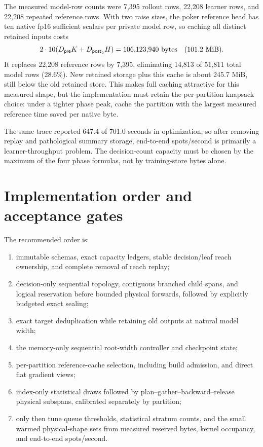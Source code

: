 \documentclass[10pt,a4paper]{article}
\begin{document}
The measured model-row counts were 7,395 rollout rows, 22,208 learner rows, and
22,208 repeated reference rows.  With two raise sizes, the poker reference head
has ten native fp16 sufficient scalars per private model row, so caching all
distinct retained inputs costs
\[
 2\cdot10(D_{\mathsf{pre}}K+D_{\mathsf{post}_2}H)
 =106{,}123{,}940\ \textnormal{bytes}\quad(101.2\ \textnormal{MiB}).
\]
It replaces 22,208 reference rows by 7,395, eliminating 14,813 of 51,811 total
model rows (28.6\%).  New retained storage plus this cache is about 245.7 MiB,
still below the old retained store.  This makes full caching attractive for
this measured shape, but the implementation must retain the per-partition
knapsack choice: under a tighter phase peak, cache the partition with the
largest measured reference time saved per native byte.

The same trace reported 647.4 of 701.0 seconds in optimization, so after
removing replay and pathological summary storage, end-to-end spots/second is
primarily a learner-throughput problem.  The decision-count capacity must be
chosen by the maximum of the four phase formulas, not by training-store bytes
alone.

\section{Implementation order and acceptance gates}

The recommended order is:
\begin{enumerate}[nosep]
  \item immutable schemas, exact capacity ledgers, stable decision/leaf reach
  ownership, and complete removal of reach replay;
  \item decision-only sequential topology, contiguous branched child spans, and
  logical reservation before bounded physical forwards, followed by explicitly
  budgeted exact sealing;
  \item exact target deduplication while retaining old outputs at natural model width;
  \item the memory-only sequential root-width controller and checkpoint state;
  \item per-partition reference-cache selection, including build admission, and
  direct flat gradient views;
  \item index-only statistical draws followed by plan--gather--backward--release
  physical subspans, calibrated separately by partition;
  \item only then tune queue thresholds, statistical stratum counts, and the
  small warmed physical-shape sets from measured reserved bytes, kernel
  occupancy, and end-to-end spots/second.
\end{enumerate}
\end{document}

